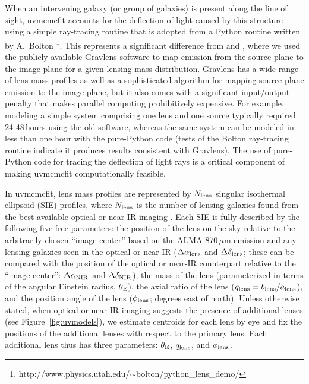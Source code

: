 \documentclass[iop]{emulateapj}
\begin{document}
When an intervening galaxy (or group of galaxies) is present along the line of
sight, {\sc uvmcmcfit} accounts for the deflection of light caused by this
structure using a simple ray-tracing routine that is adopted from a Python
routine written by A.~Bolton
\footnote{http://www.physics.utah.edu/$\sim$bolton/python\_lens\_demo/}.  This
represents a significant difference from \citet{Bussmann:2012lr} and
\citet{Bussmann:2013lr}, where we used the publicly available {\sc Gravlens}
software \citep{Keeton:2001lr} to map emission from the source plane to the
image plane for a given lensing mass distribution.  {\sc Gravlens} has a wide
range of lens mass profiles as well as a sophisticated algorithm for mapping
source plane emission to the image plane, but it also comes with a significant
input/output penalty that makes parallel computing prohibitively expensive.
For example, modeling a simple system comprising one lens and one source
typically required 24-48$\,$hours using the old software, whereas the same
system can be modeled in less than one hour with the pure-Python code (tests of
the Bolton ray-tracing routine indicate it produces results consistent with
{\sc Gravlens}).  The use of pure-Python code for tracing the deflection of
light rays is a critical component of making {\sc uvmcmcfit} computationally
feasible.

In {\sc uvmcmcfit}, lens mass profiles are represented by $N_{\rm lens}$
singular isothermal ellipsoid (SIE) profiles, where $N_{\rm lens}$ is the
number of lensing galaxies found from the best available optical or near-IR
imaging \citep[a multitude of evidence supports the SIE as a reasonable choice;
for a recent review, see][]{Treu:2010fk}.  Each SIE is fully described by the
following five free parameters: the position of the lens on the sky relative to
the arbitrarily chosen ``image center'' based on the ALMA 870$\,\mu$m emission
and any lensing galaxies seen in the optical or near-IR ($\Delta \alpha_{\rm
lens}$ and $\Delta \delta_{\rm lens}$; these can be compared with the position
of the optical or near-IR counterpart relative to the ``image center'': $\Delta
\alpha_{\rm NIR}$ and $\Delta \delta_{\rm NIR}$), the mass of the lens
(parameterized in terms of the angular Einstein radius, $\theta_{\rm E}$), the
axial ratio of the lens ($q_{\rm lens} = b_{\rm lens} / a_{\rm lens}$), and the
position angle of the lens ($\phi_{\rm lens}$; degrees east of north).  Unless
otherwise stated, when optical or near-IR imaging suggests the presence of
additional lenses (see Figure~\ref{fig:uvmodels}), we estimate centroids for
each lens by eye and fix the positions of the additional lenses with respect to
the primary lens.  Each additional lens thus has three parameters: $\theta_{\rm
E}$, $q_{\rm lens}$, and $\phi_{\rm lens}$.  
\end{document}
